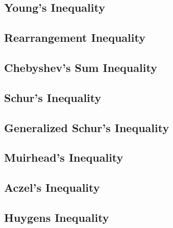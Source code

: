\documentclass[a4paper,11pt]{article}
\begin{document}
\subsection{Young's Inequality}
\begin{tcolorbox}
    
\end{tcolorbox}


\subsection{Rearrangement Inequality}
\begin{tcolorbox}
    
\end{tcolorbox}


\subsection{Chebyshev's Sum Inequality}
\begin{tcolorbox}
    
\end{tcolorbox}



\subsection{Schur's Inequality}
\begin{tcolorbox}
    
\end{tcolorbox}


\subsection{Generalized Schur's Inequality}
\begin{tcolorbox}
    
\end{tcolorbox}


\subsection{Muirhead's Inequality}
\subsection{Aczel's Inequality}
\subsection{Huygens Inequality}
\end{document}
